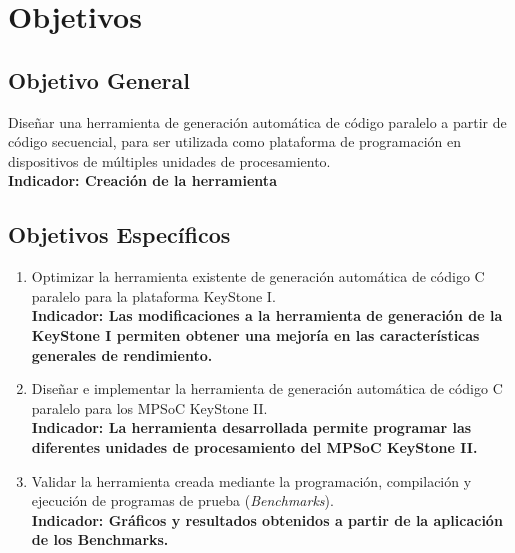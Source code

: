 
\chapter{Objetivos}
\label{ch:Objetivos}

\section{Objetivo General}

Diseñar una herramienta de generación automática de código paralelo a partir de código secuencial, para ser utilizada
como plataforma de programación en dispositivos de múltiples unidades de procesamiento.\\
\textbf{Indicador: Creación de la herramienta}


\section{Objetivos Específicos}
\begin{enumerate}
 \item Optimizar la herramienta existente de generación automática de código C paralelo para la plataforma  KeyStone I.\\
 \textbf{Indicador: Las modificaciones a la herramienta de generación de la \\KeyStone I permiten obtener una mejoría en las
 características generales de rendimiento.}
 
 \item Diseñar e implementar la herramienta de generación automática de código C paralelo para los MPSoC KeyStone II.\\
 \textbf{Indicador: La herramienta desarrollada permite programar las diferentes unidades de procesamiento del MPSoC
 KeyStone II.}
 
 \item Validar la herramienta creada mediante la programación, compilación y ejecución de programas de prueba (\textit{Benchmarks}).\\
 \textbf{Indicador: Gráficos y resultados obtenidos a partir de la aplicación de los Benchmarks.}
\end{enumerate}
